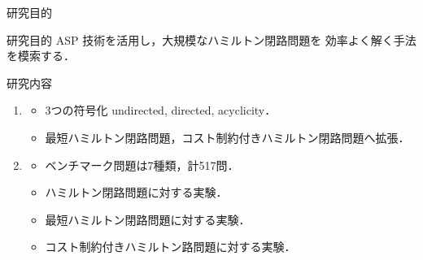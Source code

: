 \documentclass[dvipdfmx,11pt]{beamer}
\begin{document}
\begin{frame}{研究目的}
  \begin{alertblock}{研究目的}
  ASP 技術を活用し，大規模なハミルトン閉路問題を
    効率よく解く手法を模索する．
  \end{alertblock}
  \begin{block}{研究内容}
    \begin{enumerate}
    \item {}
      \begin{itemize}
      \item 3つの符号化 \textsf{undirected}, \textsf{directed}, \textsf{acyclicity}．
      \item 最短ハミルトン閉路問題，コスト制約付きハミルトン閉路問題へ拡張．
      \end{itemize}
    \item {}
      \begin{itemize}
      \item  ベンチマーク問題は7種類，計517問．
      \item ハミルトン閉路問題に対する実験．
      \item 最短ハミルトン閉路問題に対する実験．
      \item コスト制約付きハミルトン路問題に対する実験．
      \end{itemize}
    \end{enumerate}
  \end{block}
\end{frame}
\end{document}
